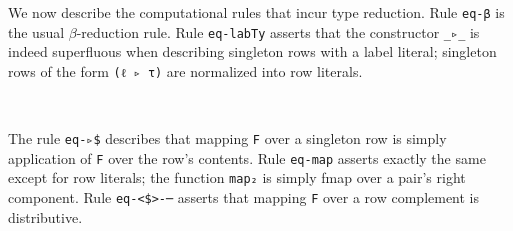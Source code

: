\documentclass[authoryear, acmsmall, screen, review, nonacm]{acmart} %
\begin{document}
We now describe the computational rules that incur type reduction. Rule \verb!eq-β! is the usual $\beta$-reduction rule. Rule \verb!eq-labTy! asserts that the constructor \verb!_▹_! is indeed superfluous when describing singleton rows with a label literal; singleton rows of the form \verb!(ℓ ▹ τ)! are normalized into row literals. 
\begin{code}%
%
\>[4]\AgdaSpace{}%
\AgdaSymbol{:}\AgdaSpace{}%
\AgdaSpace{}%
\AgdaSymbol{\{}\AgdaSpace{}%
\AgdaSymbol{:}\AgdaSpace{}%
\AgdaSpace{}%
\AgdaSymbol{(}\AgdaSpace{}%
\AgdaOperator{\AgdaInductiveConstructor{,,}}\AgdaSpace{}%
\AgdaSymbol{)}\AgdaSpace{}%
\AgdaSymbol{\}}\AgdaSpace{}%
\AgdaSymbol{\{}\AgdaSpace{}%
\AgdaSymbol{:}\AgdaSpace{}%
\AgdaSpace{}%
\AgdaSpace{}%
\AgdaSymbol{\}}\AgdaSpace{}%
\AgdaSpace{}%
\AgdaSymbol{((}\AgdaSpace{}%
\AgdaSymbol{)}\AgdaSpace{}%
\AgdaSpace{}%
\AgdaSymbol{)}\AgdaSpace{}%
\AgdaSpace{}%
\AgdaSymbol{(}\AgdaSpace{}%
\AgdaOperator{\AgdaFunction{βₖ[}}\AgdaSpace{}%
\AgdaSpace{}%
\AgdaOperator{\AgdaFunction{]}}\AgdaSymbol{)}\<%
\\
%
\>[4]\AgdaSpace{}%
\AgdaSymbol{:}\AgdaSpace{}%
\AgdaSpace{}%
\AgdaSpace{}%
\AgdaSpace{}%
\AgdaSpace{}%
\AgdaSpace{}%
\AgdaSymbol{(}\AgdaSpace{}%
\AgdaSpace{}%
\AgdaSymbol{)}\AgdaSpace{}%
\AgdaSpace{}%
\AgdaSpace{}%
\AgdaOperator{\AgdaFunction{[}}\AgdaSpace{}%
\AgdaSymbol{(}%
\>[47]\AgdaOperator{\AgdaInductiveConstructor{,}}\AgdaSpace{}%
\AgdaSymbol{)}\AgdaSpace{}%
\AgdaOperator{\AgdaFunction{]}}\AgdaSpace{}%
\AgdaSpace{}%
\<%
\end{code} 

\Ni The rule \verb!eq-▹$! describes that mapping \verb!F! over a singleton row is simply application of \verb!F! over the row's contents. Rule \verb!eq-map! asserts exactly the same except for row literals; the function \verb!map₂! is simply fmap over a pair's right component. Rule \verb!eq-<$>-─! asserts that mapping \verb!F! over a row complement is distributive. 
\end{document}
